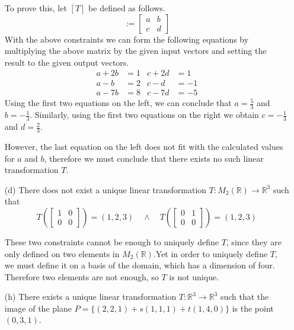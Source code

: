 \documentclass{article}
\newenvironment{answers}{ %
	\begin{enumerate}
		\setlength{\itemsep}{\bigskipamount}
}{\end{enumerate}}
\newcommand{\R}{\mathbb{R}}
\begin{document}
\begin{answers}
\begin{enumerate}
				To prove this, let \([T]\) be defined as follows.
				\begin{equation*}
					[T] := \left[ \begin{matrix}
							a & b \\ c & d
						\end{matrix} \right]
				\end{equation*}
				With the above constraints we can form the following equations by multiplying the above matrix by the given input vectors and setting the result to the given output vectors.
				\begin{align*}
					a + 2b & = 1  &
					c + 2d & = 1 \\
					a - b  & = 2  &
					c - d  & = -1 \\
					a - 7b & = 8  &
					c - 7d & = -5
				\end{align*}
				Using the first two equations on the left, we can conclude that \(a = \frac{5}{3}\) and \(b = -\frac{1}{3}\). Similarly, using the first two equations on the right we obtain \(c = -\frac{1}{3}\) and \(d = \frac{2}{3}\).

				However, the last equation on the left does not fit with the calculated values for \(a\) and \(b\), therefore we must conclude that there exists no such linear transformation \(T\).

			\item[(d)]
				There does not exist a unique linear transformation \(T : M_2(\R) \to \R^3\) such that
				\begin{equation*}
					T\left( \left[ \begin{matrix} 1 & 0 \\ 0 & 0 \end{matrix} \right] \right) = (1, 2, 3)\quad \land\quad T\left( \left[ \begin{matrix} 0 & 1 \\ 0 & 0 \end{matrix} \right] \right) = (1, 2, 3)
				\end{equation*}

				These two constraints cannot be enough to uniquely define \(T\), since they are only defined on two elements in \(M_2(\R)\).Yet in order to uniquely define \(T\), we must define it on a basis of the domain, which has a dimension of four. Therefore two elements are not enough, so \(T\) is not unique.

			\item[(h)]
				There exists a unique linear transformation \(T : \R^3 \to \R^3\) such that the image of the plane \(P = \{(2,2,1) + s(1,1,1) + t(1,4,0)\}\) is the point \((0,3,1)\).


\end{enumerate}
\end{answers}
\end{document}
